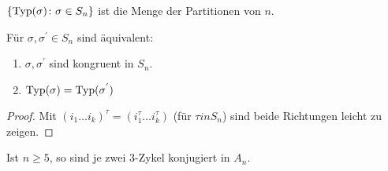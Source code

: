 \begin{lemma}
	$\{\operatorname{Typ}(\sigma) \colon \sigma \in S_n\}$ ist die Menge der Partitionen von $n$.
\end{lemma}

\begin{proposition}
	Für $\sigma, \sigma^{'} \in S_n$ sind äquivalent:
	\begin{enumerate}
		\item $\sigma, \sigma^{'}$ sind kongruent in $S_n$.
		\item $\operatorname{Typ}(\sigma) = \operatorname{Typ}(\sigma^{'})$
	\end{enumerate}
\end{proposition}

\begin{proof}
	Mit $(i_1\dots i_k)^{\tau}  = (i_1^{\tau} \dots i^{\tau}_k)$ (für $\tau in S_n$) sind beide Richtungen leicht zu zeigen.
\end{proof}

\begin{lemma}
	Ist $n \geq 5$, so sind je zwei $3$-Zykel konjugiert in $A_n$.
\end{lemma}
